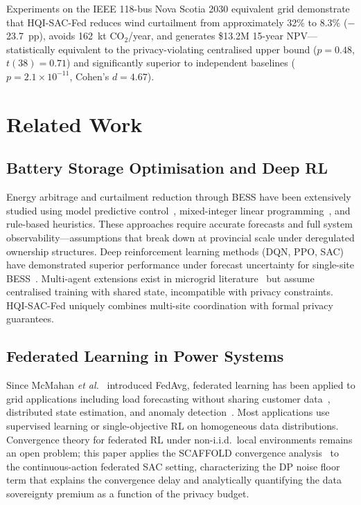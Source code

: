 \documentclass[journal]{IEEEtran}
\begin{document}
Experiments on the IEEE 118-bus Nova Scotia 2030 equivalent grid
demonstrate that HQI-SAC-Fed reduces wind curtailment from approximately
32\% to 8.3\% ($-$23.7~pp), avoids 162~kt CO$_2$/year, and generates
\$13.2M 15-year NPV---statistically equivalent to the privacy-violating
centralised upper bound ($p = 0.48$, $t(38)=0.71$) and significantly
superior to independent baselines ($p = 2.1 \times 10^{-11}$,
Cohen's $d = 4.67$).

\section{Related Work}

\subsection{Battery Storage Optimisation and Deep RL}

Energy arbitrage and curtailment reduction through BESS have been
extensively studied using model predictive control~\cite{arnoldMPC2016},
mixed-integer linear programming~\cite{farivar2013branch}, and
rule-based heuristics. These approaches require accurate forecasts and
full system observability---assumptions that break down at provincial
scale under deregulated ownership structures. Deep reinforcement learning
methods (DQN, PPO, SAC) have demonstrated superior performance under
forecast uncertainty for single-site BESS~\cite{schulman2017ppo,
fujimoto2018addressing,haarnoja2018sac}. Multi-agent extensions exist
in microgrid literature~\cite{wang2020safe} but assume centralised
training with shared state, incompatible with privacy constraints.
HQI-SAC-Fed uniquely combines multi-site coordination with formal
privacy guarantees.

\subsection{Federated Learning in Power Systems}

Since McMahan \textit{et al.}~\cite{mcmahan2017} introduced FedAvg,
federated learning has been applied to grid applications including
load forecasting without sharing customer data~\cite{fekri2022distributed},
distributed state estimation, and anomaly detection~\cite{li2022detection}.
Most applications use supervised learning or single-objective RL on
homogeneous data distributions. Convergence theory for federated RL
under non-i.i.d.\ local environments remains an open problem; this
paper applies the SCAFFOLD convergence analysis~\cite{karimireddy2020scaffold}
to the continuous-action federated SAC setting, characterizing the DP
noise floor term that explains the convergence delay and analytically
quantifying the data sovereignty premium as a function of the privacy
budget.
\end{document}
